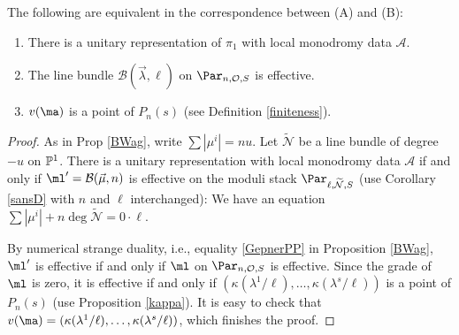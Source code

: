 \begin{proposition}
\notready\label{schubertt}
The following are equivalent in the correspondence  between (A) and (B):
\begin{enumerate}
\item There is a unitary representation of $\pi_1$ with  local monodromy data $\mathcal{A}$.
\item The line bundle $\mathcal{B}(\vec{\lambda},\ell)$ on $\Par_{n,{\mathcal{O}},S}$ is effective.
\item $v(\ma)$ is a point of $P_n(s)$ (see Definition \ref{finiteness}).
\end{enumerate}

\end{proposition}
\begin{proof}
As in Prop \ref{BWag}, write $\sum|\mu^i|=nu$. Let $\widetilde{\mathcal{N}}$ be a line bundle of degree $-u$ on $\Bbb{P}^1$.
There is a unitary representation with  local monodromy data $\mathcal{A}$ if and only if $\ml'=\mathcal{B}(\vec{\mu},n)$ is effective on the moduli stack  $\Par_{\ell,\widetilde{\mathcal{N}},S}$ (use Corollary \ref{sansD} with $n$ and $\ell$ interchanged): We have an equation
$\sum|\mu^i| +n\deg \widetilde{\mathcal{N}} =0\cdot\ell$.

By numerical strange duality, i.e., equality \eqref{GepnerPP} in Proposition \ref{BWag},  $\ml'$ is effective if and only if $\ml$ on  $\Par_{n,{\mathcal{O}},S}$ is effective. Since the grade of $\ml$ is zero, it is effective if and only if $(\kappa(\lambda^1/\ell),\dots,\kappa(\lambda^s/\ell))$ is a point of $P_n(s)$ (use Proposition \ref{kappa}).
It is easy to check that $v(\ma)=(\kappa(\lambda^1/\ell),\dots,\kappa(\lambda^s/\ell))$, which finishes the proof.
\end{proof}


